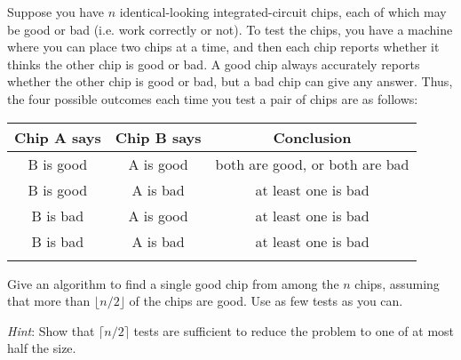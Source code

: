 \problem{}
Suppose you have $n$ identical-looking integrated-circuit chips, each of which may be good or bad (i.e. work correctly or not).  To test the chips, you have a machine where you can place two chips at a time, and then each chip reports whether it thinks the other chip is good or bad.  A good chip always accurately reports whether the other chip is good or bad, but a bad chip can give any answer. Thus, the four
possible outcomes each time you test a pair of chips are as follows: \\
\begin{center}
\begin{tabular}{ccc}
\hline
Chip A says& Chip B says& Conclusion \\
\hline
B is good & A is good & both are good, or both are bad \\
B is good & A is bad & at least one is bad \\
B is bad & A is good & at least one is bad \\
B is bad & A is bad & at least one is bad \\
\hline \\
\end{tabular}
\end{center}

Give an algorithm to find a single good chip from among the $n$ chips, assuming that more than $\lfloor n/2 \rfloor$ of the chips are good.  Use as few tests as you can.

\emph{Hint}: Show that $\lceil n/2 \rceil$ tests are sufficient to reduce the problem to one of at most half the size.

\solution{

}

\newpage
